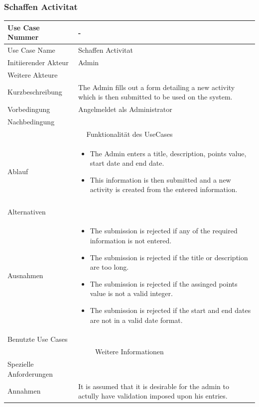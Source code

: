 \documentclass[10pt,a4paper]{article}
\begin{document}
	\subsubsection{Schaffen Activitat}
	\begin{tabular}{|l|p{.5\linewidth}|}
	\hline Use Case Nummer & - \\ 
	\hline Use Case Name & Schaffen Activitat \\ 
	\hline Initiierender Akteur & Admin \\
	\hline Weitere Akteure & \\
	\hline Kurzbeschreibung & The Admin fills out a form detailing a new activity which is then submitted to be used on the system. \\
	\hline Vorbedingung & Angelmeldet als Administrator \\
	\hline Nachbedingung &  \\
	\hline \multicolumn{2}{|c|}{Funktionalität des UseCases}\\
	\hline Ablauf & \begin{itemize}
			\item The Admin enters a title, description, points value, start date and end date.
			\item This information is then submitted and a new activity is created from the entered information.
		\end{itemize} \\ \\
	\hline Alternativen &  \\
	\hline Ausnahmen & \begin{itemize}
			\item The submission is rejected if any of the required information is not entered.
			\item The submission is rejected if the title or description are too long.
			\item The submission is rejected if the assinged points value is not a valid integer.
			\item The submission is rejected if the start and end dates are not in a valid date format.
		\end{itemize} \\
	\hline Benutzte Use Cases &  \\
	\hline \multicolumn{2}{|c|}{Weitere Informationen} \\
	\hline Spezielle Anforderungen &  \\
	\hline Annahmen & It is assumed that it is desirable for the admin to actully have validation imposed upon his entries. \\
	\hline
	\end{tabular}
	
\end{document}
